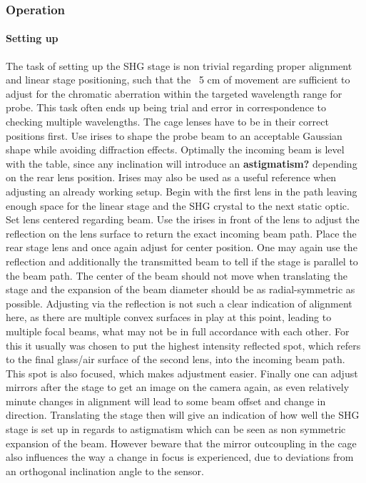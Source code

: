 \documentclass[twoside,openright]{scrreprt}
\begin{document}
\subsubsection{Operation}
\paragraph{Setting up}
The task of setting up the SHG stage is non trivial regarding proper alignment and linear stage positioning, such that the ~5 cm of movement are sufficient to adjust for the chromatic aberration within the targeted wavelength range for probe. This task often ends up being trial and error in correspondence to checking multiple wavelengths. The cage lenses have to be in their correct positions first.\newline
Use irises to shape the probe beam to an acceptable Gaussian shape while avoiding diffraction effects. Optimally the incoming beam is level with the table, since any inclination will introduce an \textbf{astigmatism?} depending on the rear lens position. Irises may also be used as a useful reference when adjusting an already working setup.\newline
Begin with the first lens in the path leaving enough space for the linear stage and the SHG crystal to the next static optic. Set lens centered regarding beam. Use the irises in front of the lens to adjust the reflection on the lens surface to return the exact incoming beam path.\newline
Place the rear stage lens and once again adjust for center position. One may again use the reflection and additionally the transmitted beam to tell if the stage is parallel to the beam path. The center of the beam should not move when translating the stage and the expansion of the beam diameter should be as radial-symmetric as possible. Adjusting via the reflection is not such a clear indication of alignment here, as there are multiple convex surfaces in play at this point, leading to multiple focal beams, what may not be in full accordance with each other. For this it usually was chosen to put the highest intensity reflected spot, which refers to the final glass/air surface of the second lens, into the incoming beam path. This spot is also focused, which makes adjustment easier.\newline
Finally one can adjust mirrors after the stage to get an image on the camera again, as even relatively minute changes in alignment will lead to some beam offset and change in direction. Translating the stage then will give an indication of how well the SHG stage is set up in regards to astigmatism which can be seen as non symmetric expansion of the beam. However beware that the mirror outcoupling in the cage also influences the way a change in focus is experienced, due to deviations from an orthogonal inclination angle to the sensor.
\end{document}
